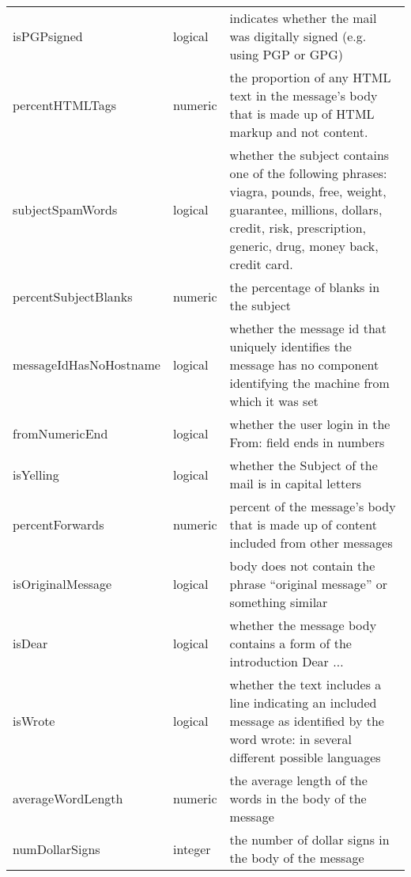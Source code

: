 \begin{table}[htbp]
\begin{center}
\begin{tabular}{llp{4in}}
isPGPsigned            &  logical  & indicates whether the mail was digitally signed (e.g. using PGP or GPG) \\
percentHTMLTags        &   numeric &  the proportion of any HTML text in the message's body that is made up of HTML markup and not content. \\
subjectSpamWords       &  logical  &  whether the subject contains one of the following phrases:
viagra, pounds, free, weight, guarantee, millions, dollars,
credit, risk, prescription, generic, drug, money back, credit card.\\
percentSubjectBlanks   &  numeric  & the percentage of blanks in the subject \\
messageIdHasNoHostname &  logical  & whether the message id that uniquely identifies the message has no component identifying the machine from which it was set \\
fromNumericEnd         &  logical &  whether the user login in the From: field ends in numbers \\
isYelling              &  logical  &  whether the Subject of the mail is in capital letters \\
percentForwards        &  numeric & percent of the message's body  that is made up of content included from other messages  \\
isOriginalMessage      &  logical & body does not contain the phrase ``original message'' or something similar \\
isDear                 &  logical & whether the message body contains a form of the introduction Dear $\ldots$ \\
isWrote                &  logical &  whether the text includes a line indicating an included message as identified by the word wrote: in several different possible languages  \\
averageWordLength      &  numeric & the average length of the words in the body of the message \\
numDollarSigns         &   integer &  the number of dollar signs in the body of the message \\
\end{tabular}   
\end{center}
\end{table}
